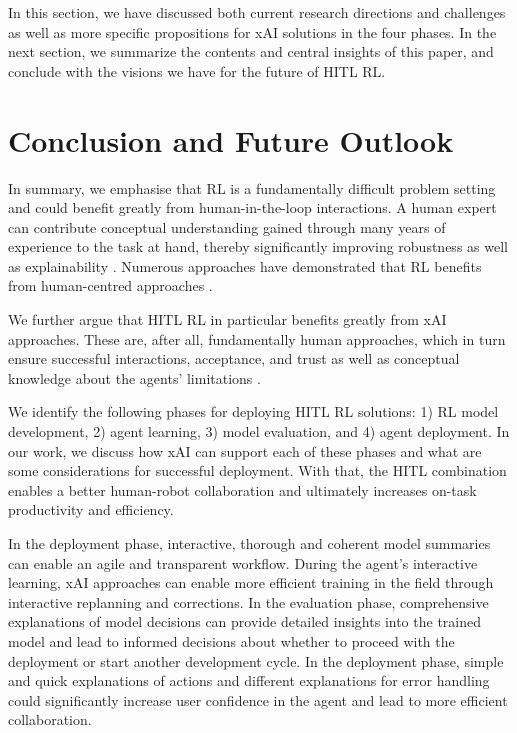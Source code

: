 \documentclass[twoside,11pt]{article}
\begin{document}
In this section, we have discussed both current research directions and challenges as well as more specific propositions for xAI solutions in the four phases. In the next section, we summarize the contents and central insights of this paper, and conclude with the visions we have for the future of HITL RL.

\section{Conclusion and Future Outlook}
\label{sec:conclusion}
In summary, we emphasise that RL is a fundamentally difficult problem setting and could benefit greatly from human-in-the-loop interactions. A human expert can contribute conceptual understanding gained through many years of experience to the task at hand, thereby significantly improving robustness as well as explainability \citep{Holzinger:2021:TrustAI}. Numerous approaches have demonstrated that RL benefits from human-centred approaches \citep{Li:2019:HumanCenteredRLSurvey,MatthewsonPilarski:2022:DesigningAndEvaluatingHCIML}.

We further argue that HITL RL in particular benefits greatly from xAI approaches. These are, after all, fundamentally human approaches, which in turn ensure successful interactions, acceptance, and trust as well as conceptual knowledge about the agents' limitations \citep{heuillet2021explainability,milani2022survey}.

We identify the following phases for deploying HITL RL solutions: 1) RL model development, 2) agent learning, 3) model evaluation, and 4) agent deployment. In our work, we discuss how xAI can support each of these phases and what are some considerations for successful deployment. With that, the HITL combination enables a better human-robot collaboration and ultimately increases on-task productivity and efficiency.

In the deployment phase, interactive, thorough and coherent model summaries can enable an agile and transparent workflow. During the agent's interactive learning, xAI approaches can enable more efficient training in the field through interactive replanning and corrections. In the evaluation phase, comprehensive explanations of model decisions can provide detailed insights into the trained model and lead to informed decisions about whether to proceed with the deployment or start another development cycle. In the deployment phase, simple and quick explanations of actions and different explanations for error handling could significantly increase user confidence in the agent and lead to more efficient collaboration.
\end{document}
